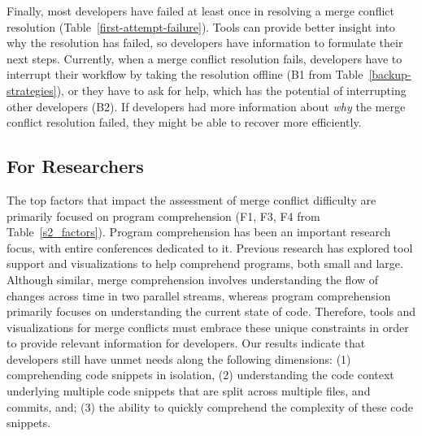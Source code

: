 Finally, most developers have failed at least once in resolving a merge conflict resolution (Table~\ref{first-attempt-failure}).
Tools can provide better insight into why the resolution has failed, so developers have information to formulate their next steps.
Currently, when a merge conflict resolution fails, developers have to interrupt their workflow by taking the resolution offline (B1 from Table~\ref{backup-strategies}), or they have to ask for help, which has the potential of interrupting other developers (B2).
If developers had more information about \emph{why} the merge conflict resolution failed, they might be able to recover more efficiently.

\subsection{For Researchers}

The top factors that impact the assessment of merge conflict difficulty are primarily focused on program comprehension (F1, F3, F4 from Table~\ref{s2_factors}).
Program comprehension has been an important research focus, with entire conferences dedicated to it.
Previous research has explored tool support and visualizations to help comprehend programs, both small and large.
Although similar, merge comprehension involves understanding the flow of changes across time in two parallel streams, whereas program comprehension primarily focuses on understanding the current state of code.
Therefore, tools and visualizations for merge conflicts must embrace these unique constraints in order to provide relevant information for developers.
Our results indicate that developers still have unmet needs along the following dimensions: (1) comprehending code snippets in isolation, (2) understanding the code context underlying multiple code snippets that are split across multiple files, and commits, and; (3) the ability to quickly comprehend the complexity of these code snippets. 


